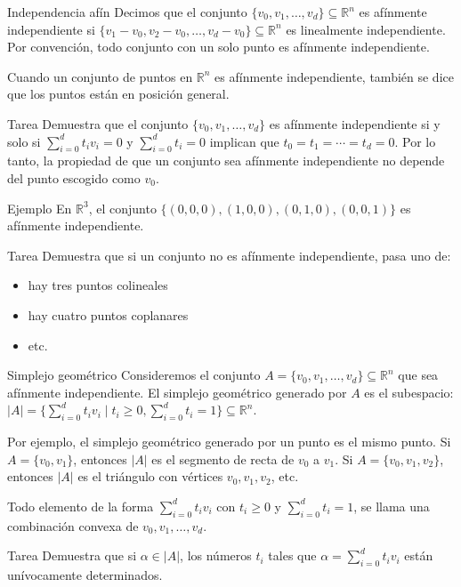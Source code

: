 \documentclass[spanish, presentation]{beamer}
\begin{document}
\begin{frame}[label={sec:org8224da6}]{Independencia afín}
Decimos que el conjunto \(\{v_{0},v_{1},\ldots,v_{d}\}\subseteq \mathbb{R}^{n}\) es \alert{afínmente independiente}
si \(\{v_{1}-v_{0},v_{2}-v_{0},\ldots,v_{d}-v_{0}\}\subseteq \mathbb{R}^{n}\) es \alert{linealmente independiente}. Por convención, todo conjunto con un solo punto es afínmente independiente.

Cuando un conjunto de puntos en \(\mathbb{R}^{n}\) es afínmente independiente, también se dice que los puntos están en \alert{posición general}.

\alert{Tarea}
Demuestra que el conjunto \(\{v_{0},v_{1},\ldots,v_{d}\}\) es afínmente independiente si y solo si \(\sum_{i=0}^{d}t_{i}v_{i}=0\) y \(\sum_{i=0}^{d}t_{i}=0\) implican que \(t_{0}=t_{1}=\cdots=t_{d}=0\). Por lo tanto, la propiedad de que un conjunto sea afínmente independiente no depende del punto escogido como \(v_{0}\).

\alert{Ejemplo}
En \(\mathbb{R}^{3}\), el conjunto \(\{(0,0,0),(1,0,0),(0,1,0),(0,0,1)\}\) es afínmente independiente.

\alert{Tarea}
Demuestra que si un conjunto no es afínmente independiente, pasa uno de:
\begin{itemize}
\item hay tres puntos colineales
\item hay cuatro puntos coplanares
\item etc.
\end{itemize}
\end{frame}

\begin{frame}[label={sec:org3eb3ac2}]{Simplejo geométrico}
Consideremos el conjunto \(A=\{v_{0},v_{1},\ldots,v_{d}\}\subseteq \mathbb{R}^{n}\) que sea afínmente independiente. El \alert{simplejo geométrico generado por \(A\)} es el subespacio: \(|A|=\{\sum_{i=0}^{d}t_{i}v_{i}\mid t_{i}\geq 0, \sum_{i=0}^{d}t_{i}=1\}\subseteq \mathbb{R}^{n}\).

Por ejemplo, el simplejo geométrico generado por un punto es el mismo punto. Si \(A=\{v_{0},v_{1}\}\), entonces \(|A|\) es el segmento de recta de \(v_{0}\) a \(v_{1}\). Si \(A=\{v_{0},v_{1},v_{2}\}\), entonces \(|A|\) es el triángulo con vértices \(v_{0},v_{1},v_{2}\), etc.

Todo elemento de la forma \(\sum_{i=0}^{d}t_{i}v_{i}\)  con \(t_{i}\geq0\)  y \(\sum_{i=0}^{d}t_{i}=1\), se llama una \alert{combinación convexa} de \(v_{0},v_{1},\ldots,v_{d}\).

\alert{Tarea}
Demuestra que si \(\alpha\in|A|\), los números \(t_{i}\) tales que \(\alpha=\sum_{i=0}^{d}t_{i}v_{i}\) están unívocamente determinados.
\end{frame}
\end{document}
